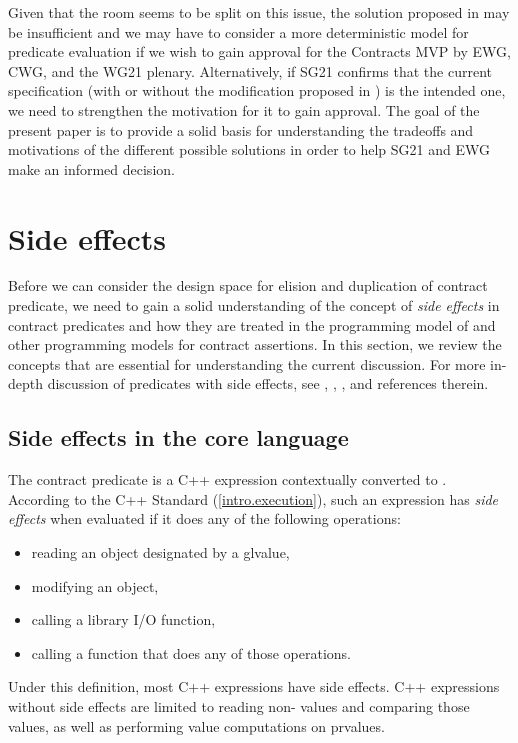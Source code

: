 Given that the room seems to be split on this issue, the solution proposed in \cite{P3119R0} may be insufficient and we may have to consider a more deterministic model for predicate evaluation if we wish to gain approval for the Contracts MVP by EWG, CWG, and the WG21 plenary. Alternatively, if SG21 confirms that the current specification (with or without the modification proposed in \cite{P3119R0}) is the intended one, we need to strengthen the motivation for it to gain approval. The goal of the present paper is to provide a solid basis for understanding the tradeoffs and motivations of the different possible solutions in order to help SG21 and EWG make an informed decision.



\section{Side effects}
\label{sec:sideeffects}

Before we can consider the design space for elision and duplication of contract predicate, we need to gain a solid understanding of the concept of \emph{side effects} in contract predicates and how they are treated in the programming model of \cite{P2900R6} and other programming models for contract assertions. In this section, we review the concepts that are essential for understanding the current discussion. For more in-depth discussion of predicates with side effects, see \cite{P2570R2}, \cite{P2712R0}, \cite{P2751R1}, and references therein.

\subsection{Side effects in the core language}
\label{subsec:core}

The contract predicate is a C++ expression contextually converted to . According to the C++ Standard (\href{https://eel.is/c++draft/intro.execution#7}{[intro.execution]}), such an expression has \emph{side effects} when evaluated if it does any of the following operations:
\begin{itemize}
\item reading an object designated by a  glvalue,
\item modifying an object,
\item calling a library I/O function,
\item calling a function that does any of those operations.
\end{itemize}
Under this definition, most C++ expressions have side effects. C++ expressions without side effects are limited to reading non- values and comparing those values, as well as performing value computations on prvalues.

